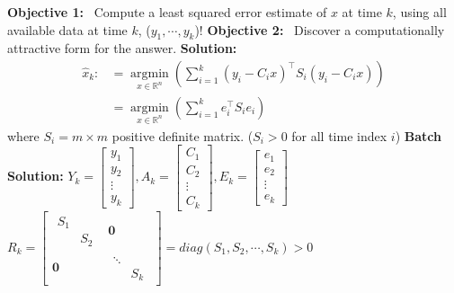 \documentclass[letterpaper]{article}
\newcommand{\real}{\mathbb R}  %
\begin{document}
    \textbf{Objective 1:}~ Compute a least squared error estimate of $x$ at time $k$, using all available data at time $k$, ($y_1,\dotsb,y_k$)!
    \newline\newline
    \textbf{Objective 2:}~ Discover a computationally attractive form for the answer.
    \newline\newline
    \textbf{Solution:}
    \begin{align*}
        \hat{x}_k:&=\underset{x \in \real^n}{\operatorname{argmin}} \left(\sum\limits_{i=1}^k (y_i-C_ix)^\top S_i(y_i-C_ix)\right)\\
        &=\underset{x \in \real^n}{\operatorname{argmin}} \left(\sum\limits_{i=1}^k e_i^\top S_ie_i\right)
    \end{align*}
    where $S_i=m \times m$ positive definite matrix. ($ S_i>0 $ for all time index $i$)
    \newline\newline
    \textbf{Batch Solution:}
    \newline\newline
    $Y_k=\left[ \begin{array}{c} y_1\\ y_2\\ \vdots \\ y_k \end{array} \right],
    A_k=\left[ \begin{array}{c} C_1\\ C_2\\ \vdots \\ C_k \end{array} \right],
    E_k=\left[ \begin{array}{c} e_1\\ e_2\\ \vdots \\ e_k \end{array} \right]$
    \newline
    $R_k=\left[
    \begin{array}{cc}
        \begin{array}{cc}
            S_1 & \\
            & S_2
        \end{array} &  \mathbf{0} \\
        \mathbf{0} & \begin{array}{cc}
        \ddots & \\
            & S_k
        \end{array}
    \end{array}\right]=diag(S_1,S_2,\dotsb,S_k)>0$
\end{document}
